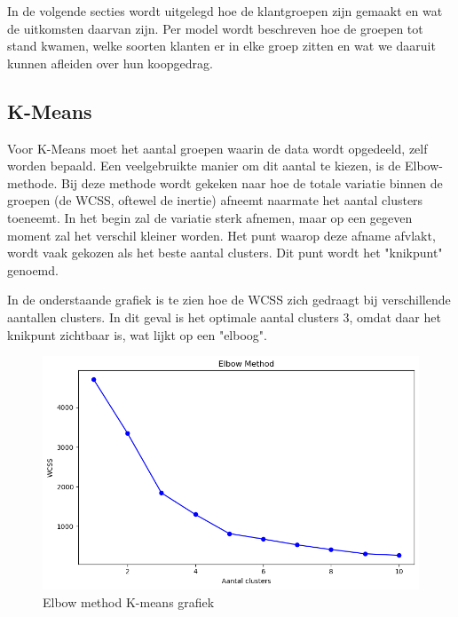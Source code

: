 In de volgende secties wordt uitgelegd hoe de klantgroepen zijn gemaakt en wat de uitkomsten daarvan zijn. Per model wordt beschreven hoe de groepen tot stand kwamen, welke soorten klanten er in elke groep zitten en wat we daaruit kunnen afleiden over hun koopgedrag.

\subsection*{K-Means}


Voor K-Means moet het aantal groepen waarin de data wordt opgedeeld, zelf worden bepaald. Een veelgebruikte manier om dit aantal te kiezen, is de Elbow-methode. Bij deze methode wordt gekeken naar hoe de totale variatie binnen de groepen (de WCSS, oftewel de inertie) afneemt naarmate het aantal clusters toeneemt. In het begin zal de variatie sterk afnemen, maar op een gegeven moment zal het verschil kleiner worden. Het punt waarop deze afname afvlakt, wordt vaak gekozen als het beste aantal clusters. Dit punt wordt het "knikpunt" genoemd.

\vspace{1em}

In de onderstaande grafiek is te zien hoe de WCSS zich gedraagt bij verschillende aantallen clusters. In dit geval is het optimale aantal clusters 3, omdat daar het knikpunt zichtbaar is, wat lijkt op een "elboog".

\begin{figure}[H]
    \centering
    \includegraphics[width=1\linewidth]{images/Kmeans/ElbowMethodKmeans}
    \caption{Elbow method K-means grafiek}
    \label{fig:ElbowMethodKmeans}
\end{figure}


\newpage

